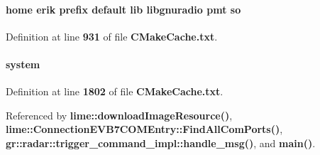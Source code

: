 \paragraph[{so}]{\setlength{\rightskip}{0pt plus 5cm}home erik prefix default lib libgnuradio {\bf pmt} so}\label{gr-radar-dev_2build_2CMakeCache_8txt_ac9ba481770d248256ea834b11e21b5ab}


Definition at line {\bf 931} of file {\bf C\+Make\+Cache.\+txt}.

\paragraph[{system}]{\setlength{\rightskip}{0pt plus 5cm}system}\label{gr-radar-dev_2build_2CMakeCache_8txt_ac4ca86dead4518ac4fd6e30172db3d9e}


Definition at line {\bf 1802} of file {\bf C\+Make\+Cache.\+txt}.



Referenced by {\bf lime\+::download\+Image\+Resource()}, {\bf lime\+::\+Connection\+E\+V\+B7\+C\+O\+M\+Entry\+::\+Find\+All\+Com\+Ports()}, {\bf gr\+::radar\+::trigger\+\_\+command\+\_\+impl\+::handle\+\_\+msg()}, and {\bf main()}.

